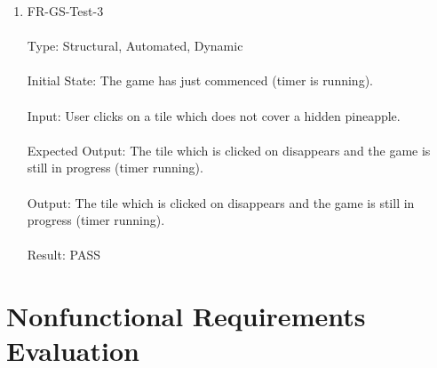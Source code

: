 \documentclass[12pt, titlepage]{article}
\begin{document}
\begin{enumerate}
\item{FR-GS-Test-3\\\\}
Type: Structural, Automated, Dynamic\\\\				
Initial State: The game has just commenced (timer is running).\\\\
Input: User clicks on a tile which does not cover a hidden pineapple.\\\\					
Expected Output: The tile which is clicked on disappears and the game is still in progress (timer running).\\\\
Output: The tile which is clicked on disappears and the game is still in progress (timer running).\\\\
Result: PASS

\end{enumerate}

\section{Nonfunctional Requirements Evaluation}
\end{document}
